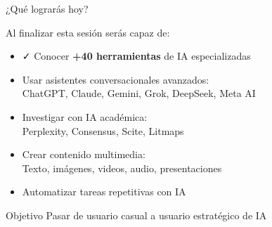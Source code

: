\documentclass[aspectratio=169,xcolor={dvipsnames}]{beamer}
\newcommand{\icono}[1]{\textcolor{azulUNSCH}{#1}}
\begin{document}
	\begin{frame}{¿Qué lograrás hoy?}
		
		Al finalizar esta sesión serás capaz de:
		
		\begin{itemize}
			\item \icono{\faCheck} Conocer \textbf{+40 herramientas} de IA especializadas
			
			\item \icono{\faRobot} Usar asistentes conversacionales avanzados:\\
			ChatGPT, Claude, Gemini, Grok, DeepSeek, Meta AI
			
			\item \icono{\faSearch} Investigar con IA académica:\\
			Perplexity, Consensus, Scite, Litmaps
			
			\item \icono{\faPalette} Crear contenido multimedia:\\
			Texto, imágenes, videos, audio, presentaciones
			
			\item \icono{\faCogs} Automatizar tareas repetitivas con IA
		\end{itemize}
		
		\vspace{0.3cm}
		\begin{alertblock}{Objetivo}
			Pasar de usuario casual a usuario estratégico de IA
		\end{alertblock}
		
	\end{frame}
	
\end{document}
